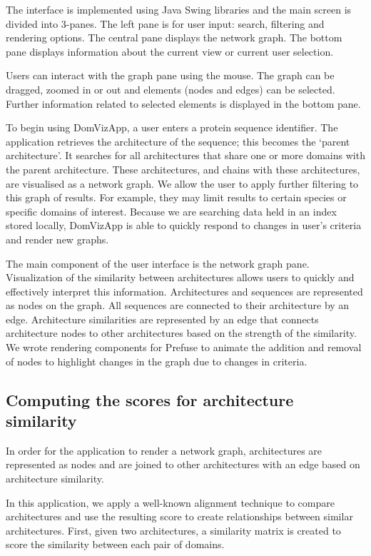 The interface is implemented using Java Swing libraries and the main screen is divided into 3-panes. The left pane is for user input: search, filtering and rendering options. The central pane displays the network graph. The bottom pane displays information about the current view or current user selection.

Users can interact with the graph pane using the mouse. The graph can be dragged, zoomed in or out and elements (nodes and edges) can be selected. Further information related to selected elements is displayed in the bottom pane.

To begin using DomVizApp, a user enters a protein sequence identifier. The application retrieves the architecture of the sequence; this becomes the `parent architecture'. It searches for all architectures that share one or more domains with the parent architecture. These architectures, and chains with these architectures, are visualised as a network graph. We allow the user to apply further filtering to this graph of results. For example, they may limit results to certain species or specific domains of interest. Because we are searching data held in an index stored locally, DomVizApp is able to quickly respond to changes in user's criteria and render new graphs. 

The main component of the user interface is the network graph pane. Visualization of the similarity between architectures allows users to quickly and effectively interpret this information. Architectures and sequences are represented as nodes on the graph. All sequences are connected to their architecture by an edge. Architecture similarities are represented by an edge that connects architecture nodes to other architectures based on the strength of the similarity. We wrote rendering components for Prefuse to animate the addition and removal of nodes to highlight changes in the graph due to changes in criteria. 


\subsection{Computing the scores for architecture similarity}

In order for the application to render a network graph, architectures are represented as nodes and are joined to other architectures with an edge based on architecture similarity.

In this application, we apply a well-known alignment technique to compare architectures and use the resulting score to create relationships between similar architectures. First, given two architectures, a similarity matrix is created to score the similarity between each pair of domains. 

